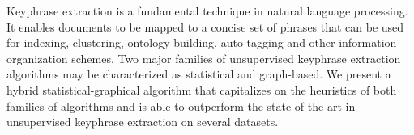 Keyphrase extraction is a fundamental technique in natural language processing. It enables documents to be mapped to a concise set of phrases that can be used for indexing, clustering, ontology building, auto-tagging and other information organization schemes. Two major families of unsupervised keyphrase extraction algorithms may be characterized as statistical and graph-based. We present a hybrid statistical-graphical algorithm that capitalizes on the heuristics of both families of algorithms and is able to outperform the state of the art in unsupervised keyphrase extraction on several datasets.
